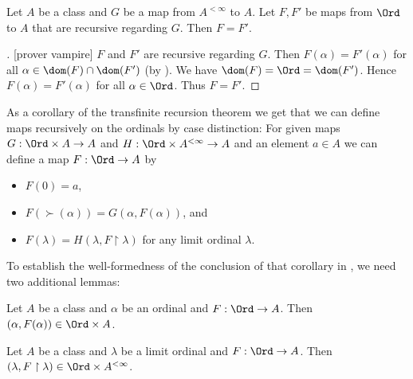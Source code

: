 \documentclass{article}
\begin{document}
  \begin{forthel}
    \begin{theorem*}[title=Transfinite Recursion Theorem: Uniqueness,id=recursion_uniqueness]
      Let $A$ be a class and $G$ be a map from $A^{< \infty}$ to $A$.
      Let $F, F'$ be maps from $\Ord$ to $A$ that are recursive regarding $G$.
      Then $F = F'$.
    \end{theorem*}
    \begin{proof}[]
      [prover vampire]
      $F$ and $F'$ are recursive regarding $G$.
      Then $F(\alpha) = F'(\alpha)$ for all $\alpha \in \dom(F) \cap \dom(F')$ (by ).
      We have $\dom(F) = \Ord = \dom(F')$.
      Hence $F(\alpha) = F'(\alpha)$ for all $\alpha \in \Ord$.
      Thus $F = F'$.
    \end{proof}
  \end{forthel}

  As a corollary of the transfinite recursion theorem we get that we can
  define maps recursively on the ordinals by case distinction:
  For given maps $G : \Ord \times A \to A$ and
  $H : \Ord \times A^{< \infty} \to A$ and an element $a \in A$ we can define
  a map $F : \Ord \to A$ by
  \begin{itemize}
    \item $F(0) = a$,
    \item $F(\succ(\alpha)) = G(\alpha, F(\alpha))$, and
    \item $F(\lambda) = H(\lambda, F \restriction \lambda)$
      for any limit ordinal $\lambda$.
  \end{itemize}

  To establish the well-formedness of the conclusion of that corollary in
  \linebreak
  \Naproche, we need two additional lemmas:

  \begin{forthel}
    \begin{lemma*}
      Let $A$ be a class and $\alpha$ be an ordinal and $F : \Ord \to A$.
      Then $(\alpha, F(\alpha)) \in \Ord \times A$.
    \end{lemma*}

    \begin{lemma*}
      Let $A$ be a class and $\lambda$ be a limit ordinal and $F : \Ord \to A$.
      Then $(\lambda, F \restriction \lambda) \in \Ord \times A^{< \infty}$.
    \end{lemma*}
  \end{forthel}
\end{document}
